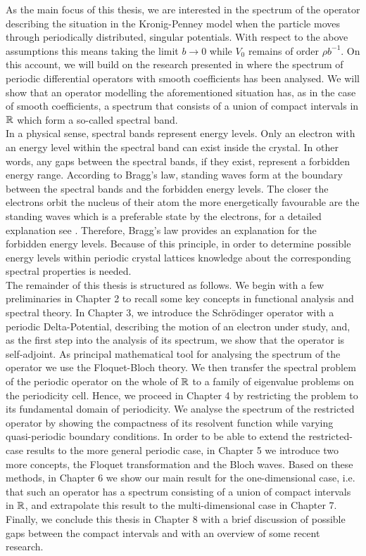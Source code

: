 As the main focus of this thesis, we are interested in the spectrum of the operator describing the situation in the Kronig-Penney model when the particle moves through periodically distributed, singular potentials. With respect to the above assumptions this means taking the limit $b \rightarrow 0$ while $V_{0}$ remains of order $\rho b^{-1}$. On this account, we will build on the research presented in \cite{dorfler2011photonic} where the spectrum of periodic differential operators with smooth coefficients has been analysed. We will show that an operator modelling the aforementioned situation has, as in the case of smooth coefficients, a spectrum that consists of a union of compact intervals in $\mathbb{R}$ which form a so-called spectral band. 
~\\

In a physical sense, spectral bands represent energy levels. Only an electron with an energy level within the spectral band can exist inside the crystal. In other words, any gaps between the spectral bands, if they exist, represent a forbidden energy range. According to Bragg's law, standing waves form at the boundary between the spectral bands and the forbidden energy levels. The closer the electrons orbit the nucleus of their atom the more energetically favourable are the standing waves which is a preferable state by the electrons, for a detailed explanation see \cite[Section 3.2]{heering2002elektrophysik}. Therefore, Bragg's law provides an explanation for the forbidden energy levels. Because of this principle, in order to determine possible energy levels within periodic crystal lattices knowledge about the corresponding spectral properties is needed.
~\\

The remainder of this thesis is structured as follows. We begin with a few preliminaries in Chapter 2 to recall some key concepts in functional analysis and spectral theory. In Chapter 3, we introduce the Schrödinger operator with a periodic Delta-Potential, describing the motion of an electron under study, and, as the first step into the analysis of its spectrum, we show that the operator is self-adjoint. As principal mathematical tool for analysing the spectrum of the operator we use the Floquet-Bloch theory. We then transfer the spectral problem of the periodic operator on the whole of $\mathbb{R}$ to a family of eigenvalue problems on the periodicity cell. Hence, we proceed in Chapter 4 by restricting the problem to its fundamental domain of periodicity. We analyse the spectrum of the restricted operator by showing the compactness of its resolvent function while varying quasi-periodic boundary conditions. In order to be able to extend the restricted-case results to the more general periodic case, in Chapter 5 we introduce two more concepts, the Floquet transformation and the Bloch waves. Based on these methods, in Chapter 6 we show our main result for the one-dimensional case, i.e. that such an operator has a spectrum consisting of a union of compact intervals in $\mathbb{R}$, and extrapolate this result to the multi-dimensional case in Chapter 7. Finally, we conclude this thesis in Chapter 8 with a brief discussion of possible gaps between the compact intervals and with an overview of some recent research.
